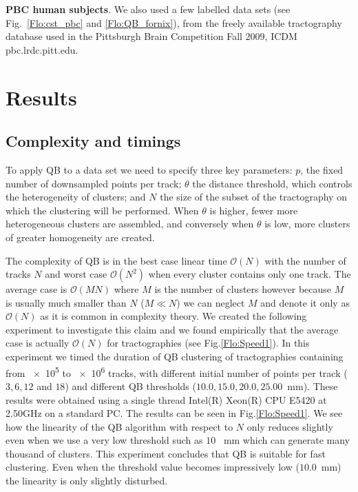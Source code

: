 \documentclass[preprint,authoryear,a4paper,10pt,onecolumn]{elsarticle}
\begin{document}
\textbf{PBC human subjects}. We also used a few labelled data sets (see
Fig.~\ref{Flo:cst_pbc} and \ref{Flo:QB_fornix}), from the freely available
tractography database used in the Pittsburgh Brain Competition Fall
$2009$, ICDM pbc.lrdc.pitt.edu.

\section{Results}

\subsection{Complexity and timings\label{sub:Complexity}}

To apply QB to a data set we need to specify three key parameters:
$p$, the fixed number of downsampled points per track; $\theta$
the distance threshold, which controls the heterogeneity of clusters;
and $N$ the size of the subset of the tractography on which the clustering
will be performed. When $\theta$ is higher, fewer more heterogeneous
clusters are assembled, and conversely when $\theta$ is low, more
clusters of greater homogeneity are created.

The complexity of QB is in the best case linear time $\mathcal{O}(N)$
with the number of tracks $N$ and worst case $\mathcal{O}(N^{2})$ when
every cluster contains only one track. The average case is
$\mathcal{O}(MN)$ where $M$ is the number of clusters however because
$M$ is usually much smaller than $N$ ($M\ll N$) we can neglect $M$ and
denote it only as $\mathcal{O}(N)$ as it is common in complexity
theory. We created the following experiment to investigate this claim
and we found empirically that the average case is actually
$\mathcal{O}(N)$ for tractographies (see Fig.\ref{Flo:Speed1}).  In this
experiment we timed the duration of QB clustering of tractographies
containing from \num{e5} to \num{e6} tracks, with different initial
number of points per track ($3,6,12$ and $18$) and different QB
thresholds ($10.0,15.0,20.0,25.00$~mm). These results were obtained using
a single thread Intel(R) Xeon(R) CPU E5420 at 2.50GHz on a standard
PC. The results can be seen in Fig.\ref{Flo:Speed1}. We see how the
linearity of the QB algorithm with respect to $N$ only reduces slightly
even when we use a very low threshold such as $10$ ~mm which can
generate many thousand of clusters. This experiment concludes that QB is
suitable for fast clustering. Even when the threshold value becomes
impressively low ($10.0$~mm) the linearity is only slightly disturbed.
\end{document}
